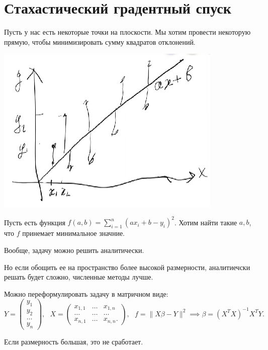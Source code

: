 \section{Стахастический градентный спуск}
\begin{problem}
    Пусть у нас есть некоторые точки на плоскости. Мы хотим провести некоторую прямую, чтобы минимизировать сумму квадратов отклонений.

    \begin{center}
        \includegraphics[scale=0.5]{img/linear_regression_problem}
    \end{center}

    Пусть есть функция $f(a, b) = \sum_{i=1}^n \left( a x_i + b - y_i \right)^2$. Хотим найти такие $a, b$, что $f$ принемает минимальное значние.

    Вообще, задачу можно решить аналитически.

    Но если обощить ее  на пространство более высокой размерности, аналитиечски решать будет сложно, численные методы лучше.

    Можно переформулировать задачу в матричном виде:
    \[Y = \begin{pmatrix}
        y_1\\ y_2\\ \dots\\ y_n 
    \end{pmatrix}, ~~~X = \begin{pmatrix}
        x_{1,1} & \dots & x_{1,n}\\
        \dots & \dots & \dots\\
        x_{n,1} & \dots & x_{n,n}.
    \end{pmatrix}, ~~~
    f = \| X \beta - Y \| ^2 \implies
    \beta = \left( X^T X \right) ^{-1} X ^T Y.\]

    Если размерность большая, это не сработает.
\end{problem}

